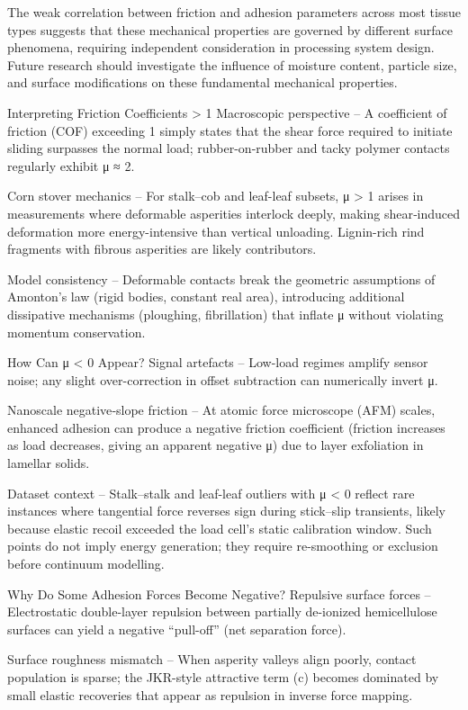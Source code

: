\documentclass[xcolor=dvipsnames,10pt,hidelinks]{article}
\begin{document}
The weak correlation between friction and adhesion parameters across most tissue types suggests that these mechanical properties are governed by different surface phenomena, requiring independent consideration in processing system design. Future research should investigate the influence of moisture content, particle size, and surface modifications on these fundamental mechanical properties.

Interpreting Friction Coefficients > 1
Macroscopic perspective – A coefficient of friction (COF) exceeding 1 simply states that the shear force required to initiate sliding surpasses the normal load; rubber-on-rubber and tacky polymer contacts regularly exhibit μ ≈ 2.

Corn stover mechanics – For stalk–cob and leaf-leaf subsets, μ > 1 arises in measurements where deformable asperities interlock deeply, making shear‐induced deformation more energy-intensive than vertical unloading. Lignin-rich rind fragments with fibrous asperities are likely contributors.

Model consistency – Deformable contacts break the geometric assumptions of Amonton’s law (rigid bodies, constant real area), introducing additional dissipative mechanisms (ploughing, fibrillation) that inflate μ without violating momentum conservation.

How Can μ < 0 Appear?
Signal artefacts – Low-load regimes amplify sensor noise; any slight over-correction in offset subtraction can numerically invert μ.

Nanoscale negative‐slope friction – At atomic force microscope (AFM) scales, enhanced adhesion can produce a negative friction coefficient (friction increases as load decreases, giving an apparent negative μ) due to layer exfoliation in lamellar solids.

Dataset context – Stalk–stalk and leaf-leaf outliers with μ < 0 reflect rare instances where tangential force reverses sign during stick–slip transients, likely because elastic recoil exceeded the load cell’s static calibration window. Such points do not imply energy generation; they require re-smoothing or exclusion before continuum modelling.

Why Do Some Adhesion Forces Become Negative?
Repulsive surface forces – Electrostatic double-layer repulsion between partially de-ionized hemicellulose surfaces can yield a negative “pull-off” (net separation force).

Surface roughness mismatch – When asperity valleys align poorly, contact population is sparse; the JKR-style attractive term (c) becomes dominated by small elastic recoveries that appear as repulsion in inverse force mapping.
\end{document}

